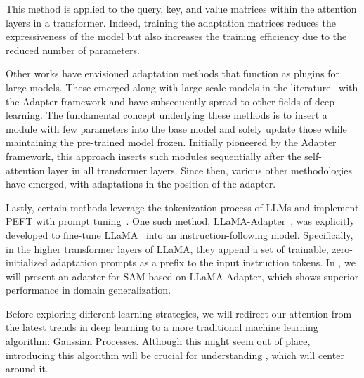 This method is applied to the query, key, and value matrices within the attention layers in a transformer. Indeed, training the adaptation matrices reduces the expressiveness of the model but also increases the training efficiency due to the reduced number of parameters.

Other works have envisioned adaptation methods that function as plugins for large models. These emerged along with large-scale models in the  literature~ with the Adapter framework and have subsequently spread to other fields of deep learning. The fundamental concept underlying these methods is to insert a module with few parameters into the base model and solely update those while maintaining the pre-trained model frozen. Initially pioneered by the Adapter framework, this approach inserts such modules sequentially after the self-attention layer in all transformer layers. Since then, various other methodologies have emerged, with adaptations in the position of the adapter.

Lastly, certain methods leverage the tokenization process of LLMs and implement PEFT with prompt tuning~. One such method, LLaMA-Adapter~, was explicitly developed to fine-tune LLaMA~ into an instruction-following model. Specifically, in the higher transformer layers of LLaMA, they append a set of trainable, zero-initialized adaptation prompts as a prefix to the input instruction tokens. In , we will present an adapter for SAM based on LLaMA-Adapter, which shows superior performance in domain generalization.


\sectionlinenew

Before exploring different learning strategies, we will redirect our attention from the latest trends in deep learning to a more traditional machine learning algorithm: Gaussian Processes. Although this might seem out of place, introducing this algorithm will be crucial for understanding , which will center around it.
